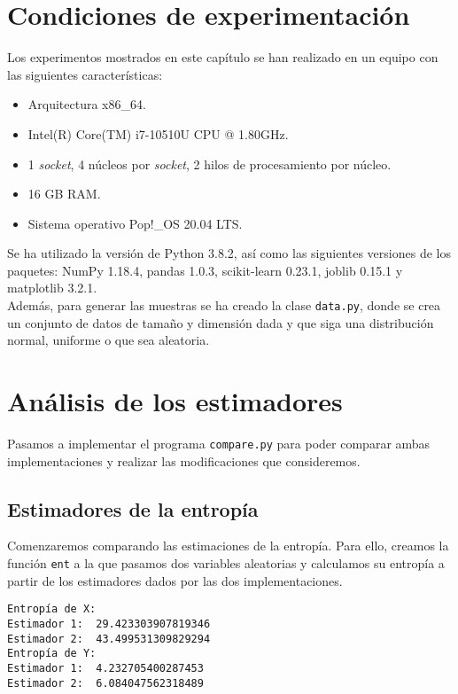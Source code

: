 \documentclass[12pt,a4paper]{report} %
\theoremstyle{definition}
\begin{document}
\section{Condiciones de experimentación}

Los experimentos mostrados en este capítulo se han realizado en un equipo con las siguientes características:

\begin{itemize}
\item Arquitectura x86\_64.
\item Intel(R) Core(TM) i7-10510U CPU @ 1.80GHz.
\item 1 \textit{socket}, 4 núcleos por \textit{socket}, 2 hilos de procesamiento por núcleo.
\item 16 GB RAM.
\item Sistema operativo Pop!\_OS 20.04 LTS.\\
\end{itemize}

Se ha utilizado la versión de Python 3.8.2, así como las siguientes versiones de los paquetes: NumPy 1.18.4, pandas 1.0.3, scikit-learn 0.23.1, joblib 0.15.1 y matplotlib 3.2.1.\\

Además, para generar las muestras se ha creado la clase \texttt{data.py}, donde se crea un conjunto de datos de tamaño y dimensión dada y que siga una distribución normal, uniforme o que sea aleatoria.\\

\section{Análisis de los estimadores}

Pasamos a implementar el programa \texttt{compare.py} para poder comparar ambas implementaciones y realizar las modificaciones que consideremos.\\

\subsection{Estimadores de la entropía}

Comenzaremos comparando las estimaciones de la entropía. Para ello, creamos la función \texttt{ent} a la que pasamos dos variables aleatorias y calculamos su entropía a partir de los estimadores dados por las dos implementaciones.

\begin{lstlisting}
Entropía de X:
Estimador 1:  29.423303907819346
Estimador 2:  43.499531309829294
Entropía de Y:
Estimador 1:  4.232705400287453
Estimador 2:  6.084047562318489

\end{lstlisting}
\end{document}
